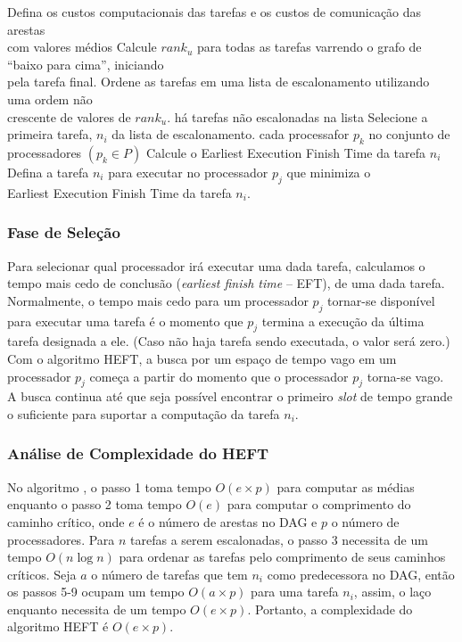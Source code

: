 \begin{codebox}
\li	Defina os custos computacionais das tarefas e os custos de comunicação das
	arestas \\com valores médios
\li	Calcule $rank_u$ para todas as tarefas varrendo o grafo de ``baixo para cima'',
	iniciando \\pela tarefa final.
\li Ordene as tarefas em uma lista de escalonamento utilizando uma ordem não \\
	crescente de valores de $rank_u$.
\li 	\While há tarefas não escalonadas na lista
\li 		\Do
				Selecione a primeira tarefa, $n_i$ da lista de escalonamento.
\li				\For cada processafor $p_k$ no conjunto de processadores $(p_k \in P)$
\li 				\Do
						Calcule o Earliest Execution Finish Time da tarefa $n_i$
					\End
\li				Defina a tarefa $n_i$ para executar no processador $p_j$ que
				minimiza o \\Earliest Execution Finish Time da tarefa $n_i$.
			\End
\End
\end{codebox}

\subsubsection{Fase de Seleção}
Para selecionar qual processador irá executar uma dada tarefa, calculamos o
tempo mais cedo de conclusão (\emph{earliest finish time} -- EFT), de uma dada
tarefa. Normalmente, o tempo mais cedo para um processador $p_j$ tornar-se
disponível para executar uma tarefa é o momento que $p_j$ termina a execução
da última tarefa designada a ele. (Caso não haja tarefa sendo executada, 
o valor será zero.) Com o algoritmo HEFT, a busca por um espaço de tempo vago
em um processador $p_j$ começa a partir do momento que o processador $p_j$ 
torna-se vago. A busca continua até que seja possível encontrar 
o primeiro \emph{slot} de tempo grande o suficiente para suportar a computação
da tarefa $n_i$.

\subsubsection{Análise de Complexidade do HEFT}
No algoritmo , o passo 1 toma tempo
$O(e \times p)$ para computar as médias enquanto o passo 2 toma tempo $O(e)$ para 
computar o comprimento do caminho crítico, onde $e$ é o número de arestas no 
DAG e $p$ o número de processadores. Para $n$ tarefas a serem escalonadas, 
o passo 3 necessita de um tempo $O(n \log n)$ para ordenar as tarefas pelo
comprimento de seus caminhos críticos. Seja $a$ o número de tarefas que tem
$n_i$ como predecessora no DAG, então os passos 5-9 ocupam um tempo
$O(a \times p)$ para uma tarefa $n_i$, assim, o laço enquanto necessita de um 
tempo $O(e \times p)$. Portanto, a complexidade do algoritmo HEFT é  $O(e
\times p)$.


